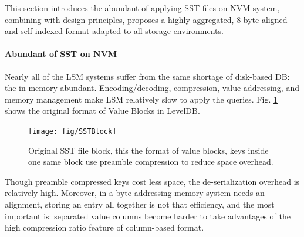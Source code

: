 This section introduces the abundant of applying SST files on NVM system, combining with design principles, proposes a highly aggregated, 8-byte aligned and self-indexed format adapted to all storage environments.

\paragraph{Abundant of SST on NVM}
Nearly all of the LSM systems suffer from the same shortage of disk-based DB\cite{sauer2018fineline}: the in-memory-abundant. Encoding/decoding, compression, value-addressing, and memory management make LSM relatively slow to apply the queries. Fig. \ref{fig:sstblock} shows the original format of Value Blocks in LevelDB.

\begin{figure}
	\centering
	\texttt{[image: fig/SSTBlock]}
	\caption{Original SST file block, this the format of value blocks, keys inside one same block use preamble compression to reduce space overhead.}
	\label{fig:sstblock}
\end{figure}

Though preamble compressed keys cost less space, the de-serialization overhead is relatively high. Moreover, in a byte-addressing memory system needs an alignment, storing an entry all together is not that efficiency, and the most important is: separated value columns become harder to take advantages of the high compression ratio feature of column-based format.


